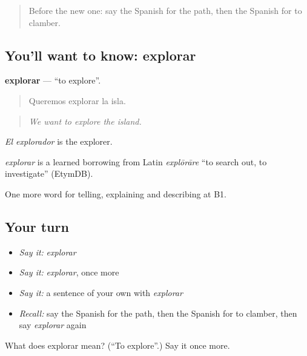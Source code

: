 \label{lesson:ES-C687-explorar}



\begin{quote}
Before the new one: say the Spanish for the path, then the Spanish for to clamber.
\end{quote}

\subsection*{You'll want to know: explorar}
\textbf{explorar} — \textquotedblleft{}to explore\textquotedblright{}.

\begin{quote}
Queremos explorar la isla.
\end{quote}

\begin{quote}
\emph{We want to explore the island.}
\end{quote}

\emph{El explorador} is the explorer.

\begin{cousinweb}
\emph{explorar} is a learned borrowing from Latin \emph{explōrāre} \textquotedblleft{}to search out, to investigate\textquotedblright{} (EtymDB).
\end{cousinweb}

\begin{grammarlens}[title={What you've built}]
One more word for telling, explaining and describing at B1.
\end{grammarlens}

\subsection*{Your turn}
\begin{itemize}
\raggedright
  \item \emph{Say it:} \emph{explorar}
  \item \emph{Say it:} \emph{explorar}, once more
  \item \emph{Say it:} a sentence of your own with \emph{explorar}
  \item \emph{Recall:} say the Spanish for the path, then the Spanish for to clamber, then say \emph{explorar} again
\end{itemize}

\begin{tcolorbox}[breakable,colback=teal!4,colframe=teal!35!black,title={Before you move on}]
What does explorar mean? (\textquotedblleft{}To explore\textquotedblright{}.) Say it once more.
\end{tcolorbox}
